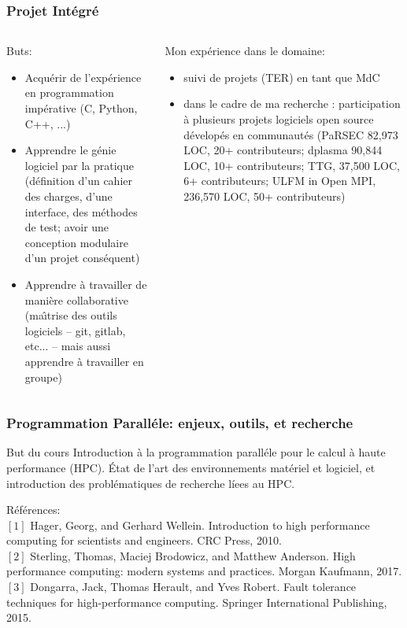 \begin{frame}
  \frametitle{Projet Int\'egr\'e}

  \begin{columns}
    \begin{column}{.45\linewidth}\small
      Buts:
      \begin{itemize}
      \item Acqu\'erir de l'exp\'erience en programmation imp\'erative (C, Python, C++, ...)
      \item Apprendre le g\'enie logiciel par la pratique (d\'efinition d'un cahier des charges, d'une interface, des m\'ethodes de test; avoir une conception modulaire d'un projet cons\'equent)
      \item Apprendre \`a travailler de mani\`ere collaborative (ma\^\i{}trise des outils logiciels -- git, gitlab, etc... -- mais aussi apprendre \`a travailler en groupe)
      \end{itemize}
    \end{column}\begin{column}{.45\linewidth}\small
      Mon exp\'erience dans le domaine:
      \begin{itemize}
      \item suivi de projets (TER) en tant que MdC
      \item dans le cadre de ma recherche : participation \`a plusieurs projets logiciels open source d\'evelop\'es en communaut\'es (PaRSEC 82,973 LOC, 20+ contributeurs; dplasma 90,844 LOC, 10+ contributeurs; TTG, 37,500 LOC, 6+ contributeurs; ULFM in Open MPI, 236,570 LOC, 50+ contributeurs)
      \end{itemize}
    \end{column}
  \end{columns}
\end{frame}

\begin{frame}
  \frametitle{Programmation Parall\'ele: enjeux, outils, et recherche}

  \begin{beamerboxesrounded}{But du cours}
    Introduction \`a la programmation parall\'ele pour le calcul \`a haute performance (HPC). \'Etat de l'art des environnements mat\'eriel et logiciel, et introduction des probl\'ematiques de recherche l\'iees au HPC.
  \end{beamerboxesrounded}

  \bigskip
  
  \small R\'ef\'erences:\\
  $[1]$ Hager, Georg, and Gerhard Wellein. Introduction to high performance computing for scientists and engineers. CRC Press, 2010.\\
  $[2]$ Sterling, Thomas, Maciej Brodowicz, and Matthew Anderson. High performance computing: modern systems and practices. Morgan Kaufmann, 2017.\\
  $[3]$ Dongarra, Jack, Thomas Herault, and Yves Robert. Fault tolerance techniques for high-performance computing. Springer International Publishing, 2015.
  
\end{frame}

